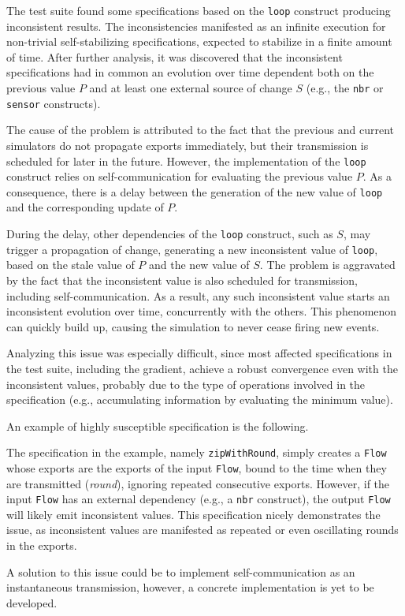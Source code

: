 The test suite found some specifications based on the \texttt{loop} construct
producing inconsistent results. The inconsistencies manifested as an infinite
execution for non-trivial self-stabilizing specifications, expected to
stabilize in a finite amount of time. After further analysis, it was discovered
that the inconsistent specifications had in common an evolution over time
dependent both on the previous value $P$ and at least one external source of
change $S$ (e.g., the \texttt{nbr} or \texttt{sensor} constructs).

The cause of the problem is attributed to the fact that the previous and
current simulators do not propagate exports immediately, but their transmission
is scheduled for later in the future. However, the implementation of the
\texttt{loop} construct relies on self-communication for evaluating the
previous value $P$. As a consequence, there is a delay between the generation
of the new value of \texttt{loop} and the corresponding update of $P$.

During the delay, other dependencies of the \texttt{loop} construct, such as
$S$, may trigger a propagation of change, generating a new inconsistent value
of \texttt{loop}, based on the stale value of $P$ and the new value of $S$. The
problem is aggravated by the fact that the inconsistent value is also scheduled
for transmission, including self-communication. As a result, any such
inconsistent value starts an inconsistent evolution over time, concurrently
with the others. This phenomenon can quickly build up, causing the simulation
to never cease firing new events.

Analyzing this issue was especially difficult, since most affected
specifications in the test suite, including the gradient, achieve a robust
convergence even with the inconsistent values, probably due to the type of
operations involved in the specification (e.g., accumulating information by
evaluating the minimum value).

An example of highly susceptible specification is the following.



The specification in the example, namely \texttt{zipWithRound}, simply creates
a \texttt{Flow} whose exports are the exports of the input \texttt{Flow}, bound
to the time when they are transmitted (\textit{round}), ignoring repeated
consecutive exports. However, if the input \texttt{Flow} has an external
dependency (e.g., a \texttt{nbr} construct), the output \texttt{Flow} will
likely emit inconsistent values. This specification nicely demonstrates the
issue, as inconsistent values are manifested as repeated or even oscillating
rounds in the exports.

A solution to this issue could be to implement self-communication as an
instantaneous transmission, however, a concrete implementation is yet to be
developed.
